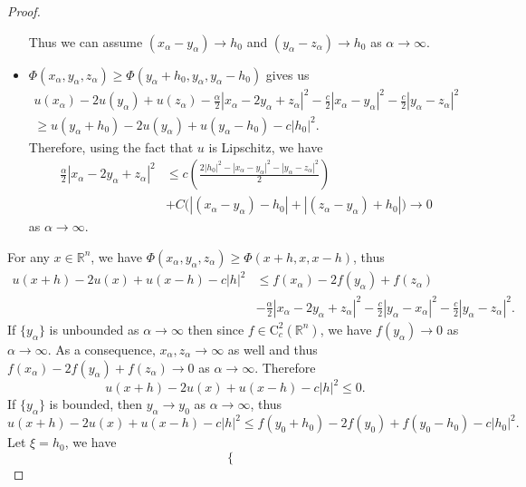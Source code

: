 \documentclass[12pt,reqno]{amsart}
\numberwithin{figure}{section}
\theoremstyle{plain}
\theoremstyle{remark}
\numberwithin{equation}{section}
\newcommand{\R}{\mathbb{R}}
\begin{document}
\begin{appendices}
\begin{proof}
\begin{itemize}
    Thus we can assume $(x_\alpha-y_\alpha)\to h_0$ and $(y_\alpha-z_\alpha)\to h_0$ as $\alpha\to \infty$.
    \item $\Phi(x_\alpha,y_\alpha,z_\alpha )\geq \Phi(y_\alpha+h_0,y_\alpha,y_\alpha-h_0)$ gives us
    \begin{align*}
        u(x_\alpha)-2u(y_\alpha) + u(z_\alpha) - \frac{\alpha}{2}|x_\alpha - 2y_\alpha+z_\alpha|^2 - \frac{c}{2}|x_\alpha-y_\alpha|^2 - \frac{c}{2}|y_\alpha-z_\alpha|^2 \\
        \geq u(y_\alpha+h_0) - 2u(y_\alpha) + u(y_\alpha-h_0) - c|h_0|^2.
    \end{align*}
    Therefore, using the fact that $u$ is Lipschitz, we have
    \begin{equation*}
    \begin{split}
        \frac{\alpha}{2}|x_\alpha - 2y_\alpha+z_\alpha|^2 
        &\leq c\left(\frac{2|h_0|^2 - |x_\alpha-y_\alpha|^2 - |y_\alpha-z_\alpha|^2}{2}\right) \\
        &+ C\Big(|(x_\alpha-y_\alpha) - h_0| + |(z_\alpha - y_\alpha) + h_0|\Big) \to 0
    \end{split}
    \end{equation*}
    as $\alpha\to \infty$.
\end{itemize}
For any $x\in \R^n$, we have $\Phi(x_\alpha,y_\alpha,z_\alpha) \geq \Phi(x+h,x,x-h)$, thus
\begin{align*}
    u(x+h)-2u(x)+u(x-h)-c|h|^2 &\leq f(x_\alpha)-2f(y_\alpha) + f(z_\alpha) \\
    &- \frac{\alpha}{2}|x_\alpha - 2y_\alpha+z_\alpha|^2-\frac{c}{2}|y_\alpha-x_\alpha|^2-\frac{c}{2}|y_\alpha-z_\alpha|^2.
\end{align*}
If $\{y_\alpha\}$ is unbounded as $\alpha\to \infty$ then since $f\in \mathrm{C}_c^2(\R^n)$, we have $f(y_\alpha)\to 0$ as $\alpha\to \infty$. As a consequence, $x_\alpha,z_\alpha \to \infty$ as well and thus $f(x_\alpha)-2f(y_\alpha) + f(z_\alpha)\to 0$ as $\alpha\to \infty$. Therefore
\begin{equation*}
    u(x+h)-2u(x)+u(x-h)-c|h|^2 \leq 0.
\end{equation*}
If $\{y_\alpha\}$ is bounded, then $y_\alpha\to y_0$ as $\alpha\to \infty$, thus
\begin{equation*}
     u(x+h)-2u(x)+u(x-h)-c|h|^2 \leq f(y_0+h_0) - 2f(y_0) + f(y_0-h_0) -c|h_0|^2.
\end{equation*}
Let $\xi = h_0$, we have
\begin{equation*}
    \begin{cases}

\end{cases}
\end{equation*}
\end{proof}
\end{appendices}
\end{document}
